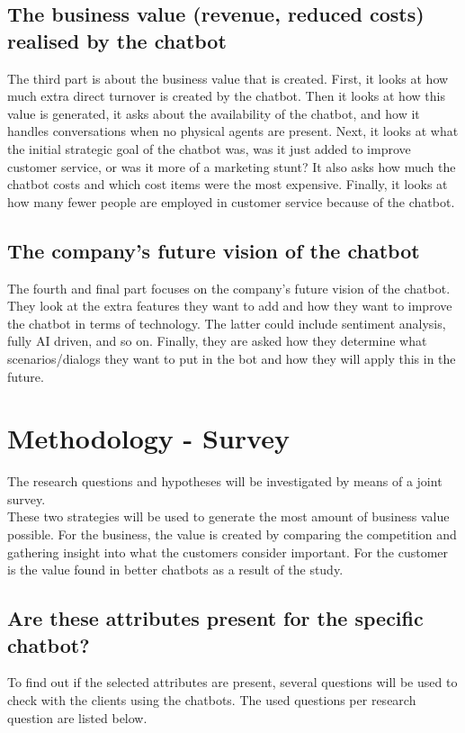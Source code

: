 \subsection{The business value (revenue, reduced costs) realised by the chatbot}
The third part is about the business value that is created. First, it looks at how much extra direct turnover is created by the chatbot. Then it looks at how this value is generated, it asks about the availability of the chatbot, and how it handles conversations when no physical agents are present. Next, it looks at what the initial strategic goal of the chatbot was, was it just added to improve customer service, or was it more of a marketing stunt?  It also asks how much the chatbot costs and which cost items were the most expensive. Finally, it looks at how many fewer people are employed in customer service because of the chatbot.\\

\subsection{The company's future vision of the chatbot}
The fourth and final part focuses on the company's future vision of the chatbot. They look at the extra features they want to add and how they want to improve the chatbot in terms of technology. The latter could include sentiment analysis, fully AI driven, and so on. Finally, they are asked how they determine what scenarios/dialogs they want to put in the bot and how they will apply this in the future.\\

\section{Methodology - Survey}
The research questions and hypotheses will be investigated by means of a joint survey.\\
\break
These two strategies will be used to generate the most amount of business value possible. For the business, the value is created by comparing the competition and gathering insight into what the customers consider important. For the customer is the value found in better chatbots as a result of the study.\\

\subsection{Are these attributes present for the specific chatbot?}
To find out if the selected attributes are present, several questions will be used to check with the clients using the chatbots. The used questions per research question are listed below.

